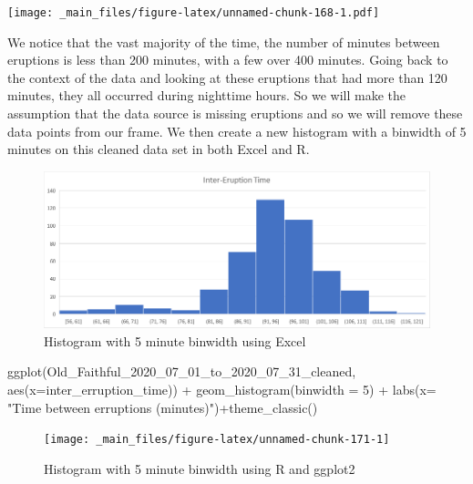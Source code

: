 \documentclass[
]{book}
\newenvironment{Shaded}{\begin{snugshade}}{\end{snugshade}}
\newcommand{\AttributeTok}[1]{\textcolor[rgb]{0.77,0.63,0.00}{#1}}
\newcommand{\DecValTok}[1]{\textcolor[rgb]{0.00,0.00,0.81}{#1}}
\newcommand{\FunctionTok}[1]{\textcolor[rgb]{0.00,0.00,0.00}{#1}}
\newcommand{\NormalTok}[1]{#1}
\newcommand{\SpecialCharTok}[1]{\textcolor[rgb]{0.00,0.00,0.00}{#1}}
\newcommand{\StringTok}[1]{\textcolor[rgb]{0.31,0.60,0.02}{#1}}
\theoremstyle{definition}
\theoremstyle{definition}
\theoremstyle{definition}
\theoremstyle{definition}
\theoremstyle{remark}
\begin{document}
\texttt{[image: \_main\_files/figure-latex/unnamed-chunk-168-1.pdf]}

We notice that the vast majority of the time, the number of minutes between eruptions is less than 200 minutes, with a few over 400 minutes. Going back to the context of the data and looking at these eruptions that had more than 120 minutes, they all occurred during nighttime hours. So we will make the assumption that the data source is missing eruptions and so we will remove these data points from our frame. We then create a new histogram with a binwidth of 5 minutes on this cleaned data set in both Excel and R.

\begin{figure}

{\centering \includegraphics[width=0.9\linewidth]{data-examples/Old-Faithful/Eruption_Hist2_Excel} 

}

\caption{Histogram with 5 minute binwidth using Excel}\label{fig:unnamed-chunk-169}
\end{figure}

\begin{Shaded}
\begin{Highlighting}[]
\FunctionTok{ggplot}\NormalTok{(Old\_Faithful\_2020\_07\_01\_to\_2020\_07\_31\_cleaned, }\FunctionTok{aes}\NormalTok{(}\AttributeTok{x=}\NormalTok{inter\_erruption\_time)) }\SpecialCharTok{+} \FunctionTok{geom\_histogram}\NormalTok{(}\AttributeTok{binwidth =} \DecValTok{5}\NormalTok{) }\SpecialCharTok{+} \FunctionTok{labs}\NormalTok{(}\AttributeTok{x=} \StringTok{"Time between erruptions (minutes)"}\NormalTok{)}\SpecialCharTok{+}\FunctionTok{theme\_classic}\NormalTok{()}
\end{Highlighting}
\end{Shaded}

\begin{figure}

{\centering \texttt{[image: \_main\_files/figure-latex/unnamed-chunk-171-1]} 

}

\caption{Histogram with 5 minute binwidth using R and ggplot2}\label{fig:unnamed-chunk-171}
\end{figure}
\end{document}

